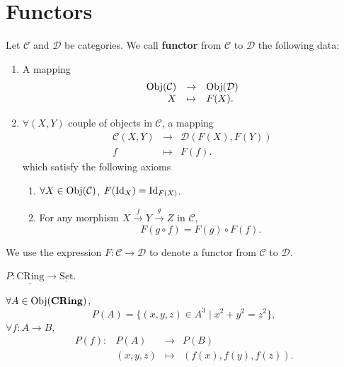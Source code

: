\section{Functors}
\begin{definitionenv}
    Let $\mathcal{C}$ and $\mathcal{D}$ be categories. We call \textbf{functor} from $\mathcal{C}$ to $\mathcal{D}$ the following data:
    \begin{enumerate}[label=(\alph*)]
        \item A mapping $$\begin{array}{rcl}
            \mathrm{Obj}(\mathcal{C})&\rightarrow&\mathrm{Obj}(\mathcal{D})\\
            X&\mapsto & F(X).
        \end{array}$$
        \item $\forall(X,Y)$ couple of objects in $\mathcal{C}$, a mapping
        $$\begin{array}{rcl}
            \mathcal{C}(X,Y)&\rightarrow&\mathcal{D}(F(X),F(Y))\\
            f&\mapsto & F(f).
        \end{array}$$
        which satisfy the following axioms
        \begin{enumerate}[label=(\roman*)]
            \item $\forall X\in \mathrm{Obj}(\mathcal{C})$, $F(\mathrm{Id}_X)=\mathrm{Id}_{F(X)}$.
            \item For any morphism $X\overset{f}{\rightarrow}Y\overset{g}{\rightarrow}Z$ in $\mathcal{C}$,
            $$F\left(g\circ f\right) = F(g)\circ F(f).$$
        \end{enumerate}
    \end{enumerate}
    We use the expression $F:\mathcal{C}\rightarrow\mathcal{D}$ to denote a functor from $\mathcal{C}$ to $\mathcal{D}$.
\end{definitionenv}
\begin{exampleenv}
    $P:\underline{\mathrm{CRing}}\rightarrow\underline{\mathrm{Set}}$.
    
    $\forall A\in \mathrm{Obj}(\mathbf{CRing})$,
    $$P(A)=\{(x,y,z)\in A^3\mid x^2+y^2=z^2\},$$
    $\forall f:A\rightarrow B$,
    $$ \begin{array}{rrcl}
        P(f):&P(A)&\rightarrow& P(B)\\
        &(x,y,z)&\mapsto&(f(x),f(y),f(z)).
    \end{array}
    $$
\end{exampleenv}
